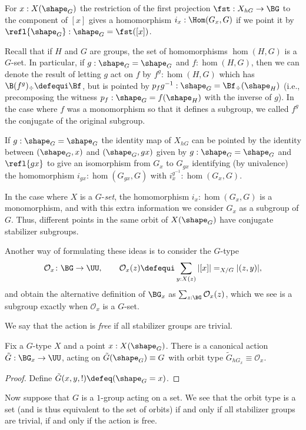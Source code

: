   For $x:X(\shape_G)$ the restriction of the first projection $\fst:X_{hG}\to\BG$ to the component of $[x]$ gives a homomorphism $i_x:\Hom(G_x,G)$ if we point it by $\refl{\shape_G}:\shape_G=\fst([x])$.

  Recall that if $H$ and $G$ are groups, the set of homomorphisms $\hom(H,G)$ is a $G$-set.  In particular, if $g:\shape_G=\shape_G$ and $f:\hom(H,G)$, then we can denote the result of letting $g$ act on $f$ by $f^g:\hom(H,G)$ which has $\B(f^g)_\div\defequi\Bf$, but is pointed by $p_fg^{-1}:\shape_G=\Bf_\div(\shape_H)$ (i.e., precomposing the witness $p_f:\shape_G=f(\shape_H)$ with the inverse of $g$).  In the case where $f$ was a monomorphism so that it defines a subgroup, we called $f^g$ the conjugate of the original subgroup.
  
 If $g:\shape_G=\shape_G$ the identity map of $X_{hG}$ can be pointed by the identity between $(\shape_G,x) $ and $(\shape_G,gx)$ given by $g:\shape_G=\shape_G$ and $\refl{gx}$ to give an isomorphism from $G_x$ to $G_{gx}$ identifying (by univalence) the homomorphism $i_{gx}:\hom(G_{gx},G)$ with $i^{g^{-1}}_x:\hom(G_x,G)$.


In the case where $X$ is a $G$-\emph{set}, the homomorphism $i_x:\hom(G_x,G)$ is a monomorphism, and with this extra information we consider $G_x$ as a subgroup of $G$.
Thus, different points in the same orbit of $X(\shape_G)$ have conjugate stabilizer subgroups.

Another way of formulating these ideas is to consider the $G$-type
$$\mathcal O_x\colon\BG\to\UU,\qquad\mathcal O_x(z)\defequi\sum_{y:X(z)}|[x]|=_{X/G}|(z,y)|,
$$
and obtain the alternative definition of $\BG_x$ as $\sum_{z:\BG}\mathcal O_x(z)$, which we see is a subgroup exactly when $\mathcal O_x$ is a $G$-set.

We say that the action is \emph{free} if all stabilizer groups are trivial.

\begin{theorem}
  \label{thm:orbitstab}
  Fix a $G$-type $X$ and a point $x : X(\shape_G)$.
  There is a canonical action $\tilde G : \BG_x \to \UU$,
  acting on $\tilde G(\shape_G)\equiv G$
  with orbit type $\tilde G_{hG_x} \equiv \mathcal O_x$.
\end{theorem}
\begin{proof}
  Define $\tilde G(x,y,!) \defeq (\shape_G = x)$.
\end{proof}

Now suppose that $G$ is a $1$-group acting on a set.
We see that the orbit type is a set
(and is thus equivalent to the set of orbits)
if and only if
all stabilizer groups are trivial,
\ie if and only if the action is free.

